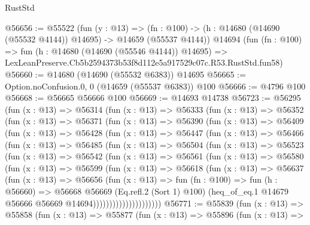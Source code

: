 \begin{lexlean}{RustStd}
\begin{coremodule}
@56656 := @55522
    (fun (y : @13) =>
    (fn : @100) -> (h : @14680 (@14690 (@55532 @4144)) @14695) -> @14659 (@55537 @4144))
    @14694
    (fun (fn : @100) =>
    fun (h : @14680 (@14690 (@55546 @4144)) @14695) =>
    LexLeanPreserve.Cb5b2594373b53f8d112e5a917529c07c.R53.RustStd.fun58)
@56660 := @14680 (@14690 (@55532 @6383)) @14695
@56665 := Option.noConfusion.{0, 0} (@14659 (@55537 @6383)) @100
@56666 := @4796 @100
@56668 := @56665 @56666 @100
@56669 := @14693 @14738
@56723 := @56295
    (fun (x : @13) =>
    @56314
      (fun (x : @13) =>
      @56333
        (fun (x : @13) =>
        @56352
          (fun (x : @13) =>
          @56371
            (fun (x : @13) =>
            @56390
              (fun (x : @13) =>
              @56409
                (fun (x : @13) =>
                @56428
                  (fun (x : @13) =>
                  @56447
                    (fun (x : @13) =>
                    @56466
                      (fun (x : @13) =>
                      @56485
                        (fun (x : @13) =>
                        @56504
                          (fun (x : @13) =>
                          @56523
                            (fun (x : @13) =>
                            @56542
                              (fun (x : @13) =>
                              @56561
                                (fun (x : @13) =>
                                @56580
                                  (fun (x : @13) =>
                                  @56599
                                    (fun (x : @13) =>
                                    @56618
                                      (fun (x : @13) =>
                                      @56637
                                        (fun (x : @13) =>
                                        @56656
                                          (fun (x : @13) =>
                                          fun (fn : @100) =>
                                          fun (h : @56660) =>
                                          @56668
                                            @56669
                                            (Eq.refl.{2} (Sort 1) @100)
                                            (heq_of_eq.{1}
                                              @14679
                                              @56666
                                              @56669
                                              @14694)))))))))))))))))))))
@56771 := @55839
    (fun (x : @13) =>
    @55858
      (fun (x : @13) =>
      @55877
        (fun (x : @13) =>
        @55896
          (fun (x : @13) =>

\end{coremodule}
\end{lexlean}
